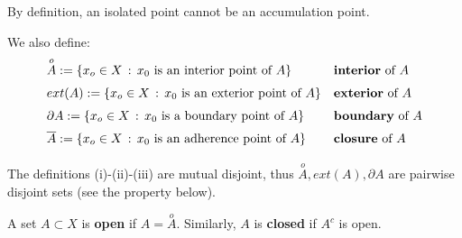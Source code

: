 \begin{defn}
\begin{enumerate}[(i)]
    \begin{marker}
    By definition, an isolated point cannot be an accumulation point.
    \end{marker}
\end{enumerate}

We also define:
\begin{equation*}
\left.
{\renewcommand*{\arraystretch}{1.5}
\begin{array}{ll}
\overset{o}{A}:=\left\{ x_o\in X\,:\, x_0\text{ is an interior point of }A \right\} &\textbf{interior}\text{ of }A \\
ext(A):=\left\{ x_o\in X\,:\, x_0\text{ is an exterior point of }A \right\} &\textbf{exterior}\text{ of }A \\
\partial A:=\left\{ x_o\in X\,:\, x_0\text{ is a boundary point of }A \right\} &\textbf{boundary}\text{ of }A \\
\overline{A}:=\left\{ x_o\in X\,:\, x_0\text{ is an adherence point of }A \right\} &\textbf{closure}\text{ of }A
\end{array}}
\right.
\end{equation*}
\begin{marker}
The definitions (i)-(ii)-(iii) are mutual disjoint, thus $\overset{o}{A},ext(A),\partial A$ are pairwise disjoint sets (see the property below).
\end{marker}
\end{defn}

\begin{defn}
A set $A\subset X$  is \textbf{open} if $A=\overset{o}{A}$. Similarly, $A$ is \textbf{closed} if $A^c$ is open.
\end{defn}

